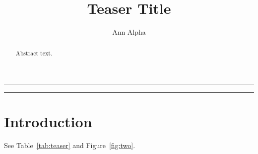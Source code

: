\documentclass{article}
\begin{document}
\title{Teaser Title}
\author{Ann Alpha}
\maketitle
\noindent\rule{4cm}{1cm}\label{tab:teaser}

\begin{center}
\rule{2cm}{1cm}
\label{fig:two}
\end{center}
\begin{abstract}
Abstract text.
\end{abstract}
\section{Introduction}
See Table~\ref{tab:teaser} and Figure~\ref{fig:two}.
\end{document}
